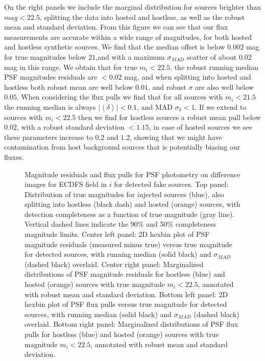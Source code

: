 On the right panels we include the marginal distribution for sources brighter than $mag < 22.5$, splitting the data into hosted and hostless, as well as the robust mean and standard deviation.
%
From this figure we can see that our \gls{flux} measurements are accurate within a wide range of magnitudes, for both hosted and hostless synthetic sources. We find that the median offset is below $0.002$ mag for true magnitudes below $21$,and with a maximum $\sigma_{MAD}$ scatter of about $0.02$ mag in this range. We obtain that for true $m_i < 22.5$, the robust running median PSF magnitudes residuals are $<0.02$ mag, and when splitting into hosted and hostless both robust mean are well below $0.01$, and robust $\sigma$ are also well below $0.05$.
%
When considering the \gls{flux} pulls we find that for all sources with $m_i<21.5$ the running median is always $|\left<\delta\right>| <0.1$, and MAD $\sigma_\delta < 1$. If we extend to sources with $m_i<22.5$ then we find for hostless sources a robust mean pull below $0.02$, with a robust standard deviation $<1.15$, in case of hosted sources we see these parameters increase to $0.2$ and $1.2$, showing that we might have contamination from host background sources that is potentially biasing our fluxes.
%
\begin{figure}
\caption{Magnitude residuals and flux pulls for \gls{PSF} photometry on difference images for ECDFS field in $i$ for detected fake sources.
Top panel: Distribution of true magnitudes for injected sources (blue), also splitting into hostless (black dash) and hosted (orange) sources, with detection completeness as a function of true magnitude (gray line). Vertical dashed lines indicate the 90\% and 50\% completeness magnitude limits.
Center left panel: 2D hexbin plot of PSF magnitude residuals (measured minus true) versus true magnitude for detected sources, with running median (solid black) and $\sigma_{MAD}$ (dashed black) overlaid.
Center right panel: Marginalized distributions of PSF magnitude residuals for hostless (blue) and hosted (orange) sources with true magnitude $m_i < 22.5$, annotated with robust mean and standard deviation. 
Bottom left panel: 2D hexbin plot of PSF flux pulls versus true magnitude for detected sources, with running median (solid black) and $\sigma_{MAD}$ (dashed black) overlaid.
Bottom right panel: Marginalized distributions of PSF flux pulls for hostless (blue) and hosted (orange) sources with true magnitude $m_i < 22.5$, annotated with robust mean and standard deviation.}
\label{fig:phot_residual_diffim_fakes}
\end{figure}
%
